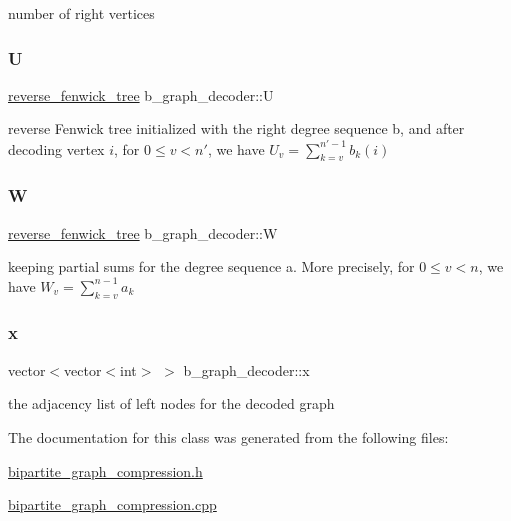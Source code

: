 number of right vertices 

\mbox{\label{classb__graph__decoder_ae15e74088bb60a096562a9bdaf380f2c}} 
\subsubsection{\texorpdfstring{U}{U}}
{\footnotesize\ttfamily \hyperlink{classreverse__fenwick__tree}{reverse\+\_\+fenwick\+\_\+tree} b\+\_\+graph\+\_\+decoder\+::U\hspace{0.3cm}{\ttfamily [private]}}



reverse Fenwick tree initialized with the right degree sequence b, and after decoding vertex $i$, for $0 \leq v <n'$, we have $U_v = \sum_{k=v}^{n'-1} b_k(i)$ 

\mbox{\label{classb__graph__decoder_a2c3f91db1f54ddfd411f74d18b01b606}} 
\subsubsection{\texorpdfstring{W}{W}}
{\footnotesize\ttfamily \hyperlink{classreverse__fenwick__tree}{reverse\+\_\+fenwick\+\_\+tree} b\+\_\+graph\+\_\+decoder\+::W\hspace{0.3cm}{\ttfamily [private]}}



keeping partial sums for the degree sequence a. More precisely, for $0 \leq v < n$, we have $W_v = \sum_{k=v}^{n-1} a_k$ 

\mbox{\label{classb__graph__decoder_a6bba2e67984f9733fc60c40dd4956587}} 
\subsubsection{\texorpdfstring{x}{x}}
{\footnotesize\ttfamily vector$<$vector$<$int$>$ $>$ b\+\_\+graph\+\_\+decoder\+::x\hspace{0.3cm}{\ttfamily [private]}}



the adjacency list of left nodes for the decoded graph 



The documentation for this class was generated from the following files\+:\begin{DoxyCompactItemize}
\item 
\hyperlink{bipartite__graph__compression_8h}{bipartite\+\_\+graph\+\_\+compression.\+h}\item 
\hyperlink{bipartite__graph__compression_8cpp}{bipartite\+\_\+graph\+\_\+compression.\+cpp}\end{DoxyCompactItemize}

